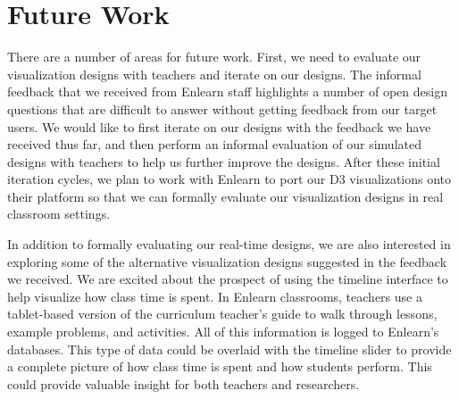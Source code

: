 \documentclass{sigchi}
\begin{document}
\section{Future Work}

There are a number of areas for future work. First, we need to evaluate our visualization designs with teachers and iterate on our designs. The informal feedback that we received from Enlearn staff highlights a number of open design questions that are difficult to answer without getting feedback from our target users. We would like to first iterate on our designs with the feedback we have received thus far, and then perform an informal evaluation of our simulated designs with teachers to help us further improve the designs. After these initial iteration cycles, we plan to work with Enlearn to port our D3 visualizations onto their platform so that we can formally evaluate our visualization designs in real classroom settings.

In addition to formally evaluating our real-time designs, we are also interested in exploring some of the alternative visualization designs suggested in the feedback we received. We are excited about the prospect of using the timeline interface to help visualize how class time is spent. In Enlearn classrooms, teachers use a tablet-based version of the curriculum teacher's guide to walk through lessons, example problems, and activities. All of this information is logged to Enlearn's databases. This type of data could be overlaid with the timeline slider to provide a complete picture of how class time is spent and how students perform. This could provide valuable insight for both teachers and researchers.
\end{document}

